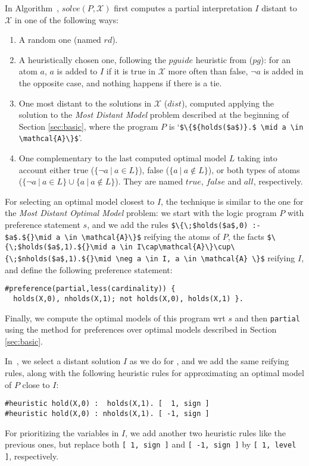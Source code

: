 \documentclass[a4paper,USenglish]{oasics-v2016}
\newcommand{\lm}[1]{\lstinline[mathescape=true]!#1!}
\newcommand{\Alabel}[1]{\textcolor{darkgray}{\small\sffamily\bfseries\mathversion{bold}{A-#1}}}
\begin{document}
In Algorithm~\Alabel{2}, $\mathit{solve}(P,\mathcal{X})$ first computes a partial interpretation $I$ 
distant to $\mathcal{X}$ in one of the following ways:
\begin{enumerate}
\item 
A random one (named $\mathit{rd}$).
\item 
A heuristically chosen one, following the $\mathit{pguide}$ heuristic from \cite{nadel11a} ($pg$):
for an atom $a$, $a$ is added to $I$ if it is true in $\mathcal{X}$ more often than false, 
$\neg a$ is added in the opposite case, and nothing happens if there is a tie.
%
\item 
One most distant to the solutions in $\mathcal{X}$ ($\mathit{dist}$), 
computed applying the solution to the \emph{Most Distant Model} problem described at the beginning of Section \ref{sec:basic}, %
where the program $P$ is `\lstinline[mathescape=true]!$\{${holds($a$)}.$ \mid a \in \mathcal{A}\}$!'.
\item 
One complementary to the last computed optimal model $L$ 
taking into account either 
true ($\{ \neg a \ | \ a \in L\}$), 
false ($\{ a \ | \ a \notin L\}$), 
or both types of atoms ($\{ \neg a \ | \ a \in L\} \cup \{ a \ | \ a \notin L\}$). 
They are named $\mathit{true}$, $\mathit{false}$ and $\mathit{all}$, respectively.
\end{enumerate}
%
For selecting an optimal model closest to $I$, 
the technique is similar to the one for the \emph{Most Distant Optimal Model} problem:
we start with the logic program $P$ with preference statement $s$, 
and we add the rules 
\lm{$\{\;$holds($a$,0) :- $a$.${}\mid a \in \mathcal{A}\}$} reifying the atoms of $P$, 
the facts 
\lm{$\{\;$holds($a$,1).${}\mid a \in I\cap\mathcal{A}\}\cup\{\;$nholds($a$,1).${}\mid \neg a \in I, a \in \mathcal{A} \}$} reifying $I$,  
and define the following preference statement: 
\begin{lstlisting}
#preference(partial,less(cardinality)) {
  holds(X,0), nholds(X,1); not holds(X,0), holds(X,1) }.
\end{lstlisting}
Finally, we compute the optimal models of this program wrt $s$ and then \lm{partial}
using the method for preferences over optimal models described in Section \ref{sec:basic}. %

In~\Alabel{3},
we select a distant solution $I$ as we do for \Alabel{2}, 
and we add the same reifying rules, 
along with the following heuristic rules for approximating an optimal model of $P$ close to $I$:
\begin{lstlisting}
#heuristic hold(X,0) :  holds(X,1). [  1, sign ]
#heuristic hold(X,0) : nholds(X,1). [ -1, sign ]
\end{lstlisting}
For prioritizing the variables in $I$, we add another two heuristic rules like the previous ones, 
but replace both \lm{[ 1, sign ]} and \lm{[ -1, sign ]} by \lm{[ 1, level ]}, respectively.
\end{document}
